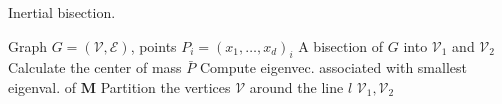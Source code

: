 \begin{algorithm}
    \caption{Inertial bisection.}
    \label{alg:inert}
    \begin{algorithmic}[1]
        \Require Graph \( G = (\mathcal{V}, \mathcal{E}) \), points \( P_i = (x_{1}, \dots, x_{d})_i \)
    \Ensure A bisection of \( G \) into \(\mathcal{V}_1\) and \(\mathcal{V}_2\)
        \State Calculate the center of mass $\bar{P}$
        \State Compute eigenvec. associated with smallest eigenval. of $\mathbf{M}$
        \State Partition the vertices $\mathcal{V}$ around the line $l$
        \State \Return \(\mathcal{V}_1, \mathcal{V}_2\)
    \EndFunction
    \end{algorithmic}
\end{algorithm}